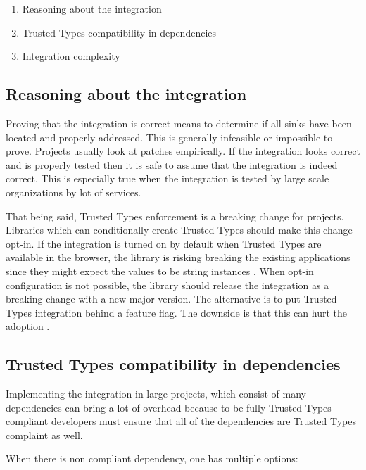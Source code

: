 \begin{enumerate}
  \item Reasoning about the integration
  \item Trusted Types compatibility in dependencies
  \item Integration complexity
\end{enumerate}

\subsection{Reasoning about the integration}
\label{sub:reason_about_integration}

Proving that the integration is correct means to determine if all sinks have been located and
properly addressed. This is generally infeasible or impossible to prove. Projects usually look at
patches empirically. If the integration looks correct and is properly tested then it is safe to
assume that the integration is indeed correct. This is especially true when the integration is
tested by large scale organizations by lot of services.

That being said, Trusted Types enforcement is a breaking change for projects. Libraries which can
conditionally create Trusted Types should make this change opt-in. If the integration is turned on
by default when Trusted Types are available in the browser, the library is risking breaking the
existing applications since they might expect the values to be string instances
\cite{dom_purify_breakage}. When opt-in configuration is not possible, the library should release
the integration as a breaking change with a new major version. The alternative is to put Trusted
Types integration behind a feature flag. The downside is that this can hurt the adoption
\cite{react_tt_feature_flag}.

\subsection{Trusted Types compatibility in dependencies}
\label{sub:tt_compatibility_in_deps}

Implementing the integration in large projects, which consist of many dependencies can bring a lot
of overhead because to be fully Trusted Types compliant developers must ensure that all of the
dependencies are Trusted Types complaint as well.

When there is non compliant dependency, one has multiple options:

